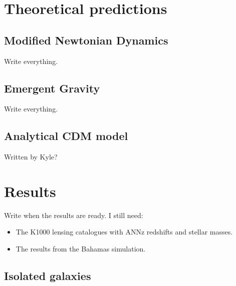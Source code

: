 \documentclass[fleqn,usenatbib]{mnras}
\begin{document}
\section{Theoretical predictions}
\label{sec:predictions}

\subsection{Modified Newtonian Dynamics}
\label{sec:MOND}
Write everything.

\subsection{Emergent Gravity}
\label{sec:EG}
Write everything.

\subsection{Analytical CDM model}
\label{sec:analytical}
Written by Kyle?

\section{Results}
\label{sec:results}
Write when the results are ready.
I still need:
\begin{itemize}
	\item The K1000 lensing catalogues with ANNz redshifts and stellar masses.
	\item The results from the Bahamas simulation.
\end{itemize}

\subsection{Isolated galaxies}
\end{document}
